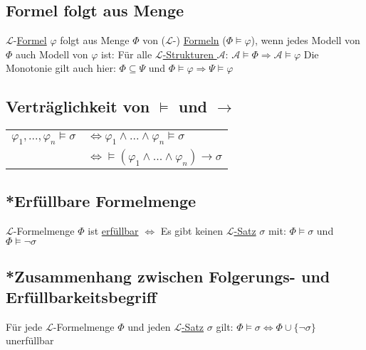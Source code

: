 \documentclass[12pt,a4paper]{article} %
\begin{document}
	\subsection{Formel folgt aus Menge}
	$\mathcal{L}$-\hyperref[Formel]{Formel} $\varphi$ folgt aus Menge $\Phi$ von ($\mathcal{L}$-) \hyperref[Formel]{Formeln} ($\Phi \hyperref[Erfullbar]{\vDash} \varphi$), wenn jedes Modell von $\Phi$ auch Modell von $\varphi$ ist: \newline
	Für alle \hyperref[Struktur]{$\mathcal{L}$-Strukturen $\mathcal{A}$}: $\mathcal{A} \hyperref[Erfullbar]{\vDash} \Phi \Rightarrow \mathcal{A} \hyperref[Erfullbar]{\vDash} \varphi$ \newline
	Die Monotonie gilt auch hier: \newline
	$\Phi \subseteq \Psi$ und $\Phi \hyperref[Erfullbar]{\vDash} \varphi \Rightarrow \Psi \hyperref[Erfullbar]{\vDash} \varphi$
	
	\subsection{Verträglichkeit von $\vDash$ und $\rightarrow$}
	\begin{tabular}{l l}
		$\varphi_1, ..., \varphi_n \hyperref[Erfullbar]{\vDash} \sigma$ & $\Leftrightarrow \varphi_1 \land ... \land \varphi_n \hyperref[Erfullbar]{\vDash} \sigma$ \\
		& $\Leftrightarrow \hyperref[Erfullbar]{\vDash} (\varphi_1 \land ... \land \varphi_n) \rightarrow \sigma$
	\end{tabular}

	\subsection{*Erfüllbare Formelmenge}
	$\mathcal{L}$-Formelmenge $\Phi$ ist \hyperref[Erfullbar]{erfüllbar} $\Leftrightarrow$ Es gibt keinen \hyperref[LSatz]{$\mathcal{L}$-Satz} $\sigma$ mit: $\Phi \hyperref[Erfullbar]{\vDash} \sigma$ und $\Phi \hyperref[Erfullbar]{\vDash} \neg \sigma$
	
	\subsection{*Zusammenhang zwischen Folgerungs- und Erfüllbarkeitsbegriff}
	Für jede $\mathcal{L}$-Formelmenge $\Phi$ und jeden \hyperref[LSatz]{$\mathcal{L}$-Satz} $\sigma$ gilt: $\Phi \hyperref[Erfullbar]{\vDash} \sigma \Leftrightarrow \Phi \cup \{\neg \sigma\}$ unerfüllbar
	
\end{document}
